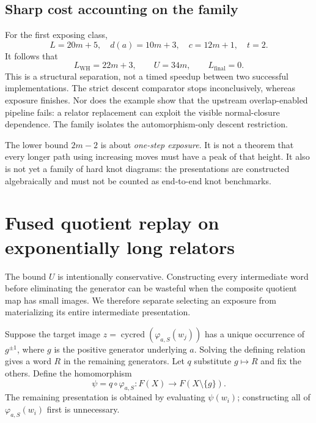 \documentclass[11pt,letterpaper]{article}
\theoremstyle{definition}\newtheorem{definition}[theorem]{Definition}
\newcommand{\cyc}{\operatorname{cycred}}
\newcommand{\set}[1]{\{#1\}}
\newcommand{\wh}{\varphi_{a,S}}
\begin{document}
\subsection{Sharp cost accounting on the family}
For the first exposing class,
\[
 L=20m+5,\quad d(a)=10m+3,\quad c=12m+1,\quad t=2.
\]
It follows that
\begin{equation}\label{eq:familycost}
 L_{\mathrm{WH}}=22m+3,\qquad U=34m,\qquad L_{\mathrm{final}}=0.
\end{equation}
This is a structural separation, not a timed speedup between two successful implementations. The strict descent comparator stops inconclusively, whereas exposure finishes. Nor does the example show that the upstream overlap-enabled pipeline fails: a relator replacement can exploit the visible normal-closure dependence. The family isolates the automorphism-only descent restriction.

The lower bound $2m-2$ is about \emph{one-step exposure}. It is not a theorem that every longer path using increasing moves must have a peak of that height. It also is not yet a family of hard knot diagrams: the presentations are constructed algebraically and must not be counted as end-to-end knot benchmarks.

\section{Fused quotient replay on exponentially long relators}\label{sec:fused}
The bound $U$ is intentionally conservative. Constructing every intermediate word before eliminating the generator can be wasteful when the composite quotient map has small images. We therefore separate selecting an exposure from materializing its entire intermediate presentation.

Suppose the target image $z=\cyc(\wh(w_j))$ has a unique occurrence of $g^{\pm1}$, where $g$ is the positive generator underlying $a$. Solving the defining relation gives a word $R$ in the remaining generators. Let $q$ substitute $g\mapsto R$ and fix the others. Define the homomorphism
\[
 \psi=q\circ\wh:F(X)\longrightarrow F(X\setminus\set{g}).
\]
The remaining presentation is obtained by evaluating $\psi(w_i)$; constructing all of $\wh(w_i)$ first is unnecessary.
\end{document}

